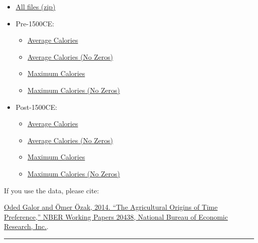\documentclass{article}
\begin{document}
\begin{itemize}
\item
  \href{https://drive.google.com/uc?export=download\&id=0By-h7HPv1NhVM1g5aW81TzVRWjQ}{All
  files (zip)}
\item
  Pre-1500CE:

  \begin{itemize}
  \itemsep1pt\parskip0pt
  \item
    \href{https://drive.google.com/uc?export=download\&id=0By-h7HPv1NhVeEhsRmdRWkFJX2M}{Average
    Calories}
  \item
    \href{https://drive.google.com/uc?export=download\&id=0By-h7HPv1NhVcHgxa1EyOEpURUk}{Average
    Calories (No Zeros)}
  \item
    \href{https://drive.google.com/uc?export=download\&id=0By-h7HPv1NhVR2dDUm5fU2lMN2c}{Maximum
    Calories}
  \item
    \href{https://drive.google.com/uc?export=download\&id=0By-h7HPv1NhVUzVDTXBST3d4YlE}{Maximum
    Calories (No Zeros)}
  \end{itemize}
\item
  Post-1500CE:

  \begin{itemize}
  \itemsep1pt\parskip0pt
  \item
    \href{https://drive.google.com/uc?export=download\&id=0By-h7HPv1NhVT05GNGtaZk13S2M}{Average
    Calories}
  \item
    \href{https://drive.google.com/uc?export=download\&id=0By-h7HPv1NhVcHVJcmgtb09FTXM}{Average
    Calories (No Zeros)}
  \item
    \href{https://drive.google.com/uc?export=download\&id=0By-h7HPv1NhVR2ZDemhYd1hqZms}{Maximum
    Calories}
  \item
    \href{https://drive.google.com/uc?export=download\&id=0By-h7HPv1NhVajhjbVcyakFYMHc}{Maximum
    Calories (No Zeros)}
  \end{itemize}
\end{itemize}

If you use the data, please cite:

\href{https://ideas.repec.org/p/smu/ecowpa/1407.html}{Oded Galor and
Ömer Özak, 2014. ``The Agricultural Origins of Time Preference,'' NBER
Working Papers 20438, National Bureau of Economic Research, Inc.}.

\begin{center}\rule{0.5\linewidth}{\linethickness}\end{center}
\end{document}
